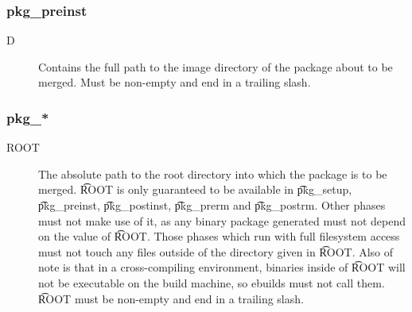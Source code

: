 \subsubsection{pkg\_preinst}
\begin{description}
\item[D] Contains the full path to the image directory of the package about to be merged. Must be
    non-empty and end in a trailing slash.
\end{description}

\subsubsection{pkg\_*}
\begin{description}
\item[ROOT] The absolute path to the root directory into which the package is to be merged. \t{ROOT}
    is only guaranteed to be available in \t{pkg\_setup}, \t{pkg\_preinst}, \t{pkg\_postinst},
    \t{pkg\_prerm} and \t{pkg\_postrm}. Other phases must not make use of it, as any binary
    package generated must not depend on the value of \t{ROOT}\@. Those phases which run with full
    filesystem access must not touch any files outside of the directory given in \t{ROOT}\@. Also of
    note is that in a cross-compiling environment, binaries inside of \t{ROOT} will not be
    executable on the build machine, so ebuilds must not call them. \t{ROOT} must be non-empty
    and end in a trailing slash.
\end{description}

